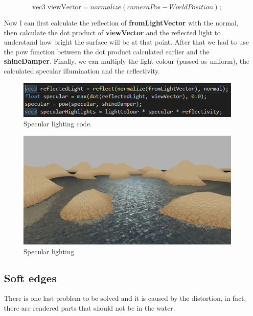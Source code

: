 \begin{equation}
\text{vec3 viewVector} = normalize(cameraPos - WorldPosition);
\end{equation}

\noindent
Now I can first calculate the reflection of \textbf{fromLightVector} with the normal, then calculate the dot product of \textbf {viewVector} and the reflected light to understand how bright the surface will be at that point. After that we had to use the pow function between the dot product calculated earlier and the \textbf{shineDamper}. Finally, we can multiply the light colour (passed as uniform), the calculated specular illumination and the reflectivity.

\begin{figure}[hbt!]
	\centering
	\includegraphics[width= 1
	\textwidth]{images/Light.png}
	\caption{Specular lighting code.}
	\label{fig::highlights}
\end{figure} 

\begin{figure}[hbt!]
	\centering
	\includegraphics[width= 1
	\textwidth]{images/Water5.png}
	\caption{Specular lighting}
\end{figure} 

\subsection{Soft edges}
There is one last problem to be solved and it is caused by the distortion, in fact, there are rendered parts that should not be in the water.

\newpage

